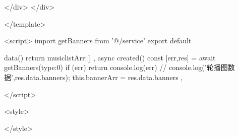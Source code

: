     </div>
  </div>

</template>

<script>
import { getBanners } from '@/service'
export default {

    data(){
        return {
            musiclistArr:[]
        }
    },
    async created(){
        const [err,res] = await getBanners({type:0})
        if (err) return console.log(err)
        // console.log('轮播图数据',res.data.banners);
        this.bannerArr = res.data.banners
    },
}
</script>

<style>

</style>